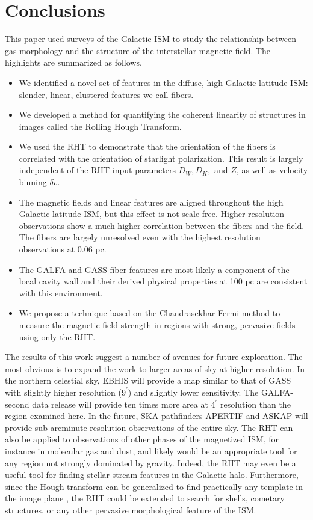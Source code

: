 \section{Conclusions}\label{conclusion}

This paper used \hi surveys of the Galactic ISM to study the relationship between gas morphology and the structure of the interstellar magnetic field. The highlights are summarized as follows.
\begin{itemize}
\item{We identified a novel set of features in the diffuse, high Galactic latitude \hi ISM: slender, linear, clustered features we call \hi fibers.}
\item{We developed a method for quantifying the coherent linearity of structures in images called the Rolling Hough Transform. }
\item{We used the RHT to demonstrate that the orientation of the fibers is correlated with the orientation of starlight polarization. This result is largely independent of the RHT input parameters $D_W, D_K,$ and $Z$, as well as velocity binning $\delta v$.}
\item{The magnetic fields and linear \hi features are aligned throughout the high Galactic latitude ISM, but this effect is not scale free.  Higher resolution observations show a much higher correlation between the fibers and the field.  The fibers are largely unresolved even with the highest resolution observations at 0.06 pc.}
\item{The GALFA-\hi and GASS fiber features are most likely a component of the local cavity wall and their derived physical properties at 100 pc are consistent with this environment.}
\item{We propose a technique based on the Chandrasekhar-Fermi method to measure the magnetic field strength in regions with strong, pervasive fields using only the RHT.}
\end{itemize}

The results of this work suggest a number of avenues for future exploration. The most obvious is to expand the work to larger areas of sky at higher resolution. In the northern celestial sky, EBHIS \citep{Kerp:2011ga} will provide a map similar to that of GASS with slightly higher resolution ($9^\prime$) and slightly lower sensitivity. The GALFA-\hi second data release will provide ten times more area at 4$^\prime$ resolution than the region examined here. In the future, SKA pathfinders APERTIF \citep{Verheijen:2009ua} and ASKAP \citep{Duffy:2012ie, 2012arXiv1207.0891D} will provide sub-arcminute resolution observations of the entire sky. The RHT can also be applied to observations of other phases of the magnetized ISM, for instance in molecular gas and dust, and likely would be an appropriate tool for any region not strongly dominated by gravity. Indeed, the RHT may even be a useful tool for finding stellar stream features in the Galactic halo. Furthermore, since the Hough transform can be generalized to find practically any template in the image plane \citep{Duda:1972uj}, the RHT could be extended to search for shells, cometary structures, or any other pervasive morphological feature of the ISM.

